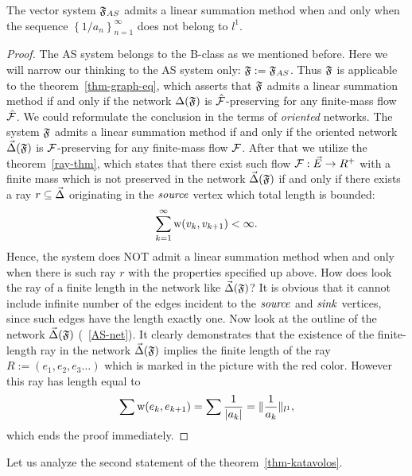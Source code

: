 \documentclass[12pt]{article}
\begin{document}
      \begin{prop}
          The vector system $\mathfrak{F}_{AS}$ admits a linear summation method when and only when
            the sequence $\left\{1/a_n\right\}_{n=1}^\infty$ does not belong to $l^1$.
      \end{prop}
      \begin{proof}
        The AS system belongs to the B-class as we mentioned before.
        Here we will narrow our thinking to the AS system only: $\mathfrak{F} := \mathfrak{F}_{AS}$.
        Thus $\mathfrak{F}$ is applicable to the theorem~\ref{thm-graph-eq}, which asserts
          that $\mathfrak{F}$ admits a linear summation method if and only if
          the network $\Delta(\mathfrak{F})$ is $\mathcal{\hat{F}}$-preserving for any
          finite-mass flow $\mathcal{\hat{F}}$.
        We could reformulate the conclusion in the terms of \emph{oriented} networks.
        The system $\mathfrak{F}$ admits a linear summation method if and only if
          the oriented network $\vec{\Delta}(\mathfrak{F})$ is $\mathcal{F}$-preserving for any
          finite-mass flow $\mathcal{F}$.
        After that we utilize the theorem~\ref{ray-thm}, which states that there exist such
          flow $\mathcal{F}: \vec{E} \to R^{+}$ with a finite mass which is not preserved in
          the network $\vec{\Delta}(\mathfrak{F})$
          if and only if there exists a ray $r \subseteq \vec{\Delta} $ originating in the $\mathit{source}$ vertex
          which total length is bounded:
          \[
            \sum_{k=1}^\infty \mathrm{w}(v_k, v_{k+1}) < \infty.
          \]
          Hence, the system does NOT admit a linear summation method when and only when there is such ray $r$
            with the properties specified up above.
          How does look the ray of a finite length in the network like $\vec{\Delta}(\mathfrak{F})$?
          It is obvious that it cannot include infinite number of the edges incident to the
            $\mathit{source}$ and $\mathit{sink}$ vertices, since such edges have the length exactly one.
          Now look at the outline of the network $\vec{\Delta}(\mathfrak{F})$ (~\ref{AS-net}).
          It clearly demonstrates that
            the existence of the finite-length ray in the network $\vec{\Delta}(\mathfrak{F})$ implies
            the finite length of the ray $R:=(e_1,e_2,e_3\dots)$ which is marked in the picture with the red color.
          However this ray has length equal to
          \[
            \sum \mathrm{w}(e_k, e_{k+1}) = \sum \frac{1}{|a_k|} = \|\frac{1}{a_k}\|_{l^1},
          \]
          which ends the proof immediately.
      \end{proof}
      Let us analyze the second statement of the theorem~\ref{thm-katavolos}.
\end{document}
